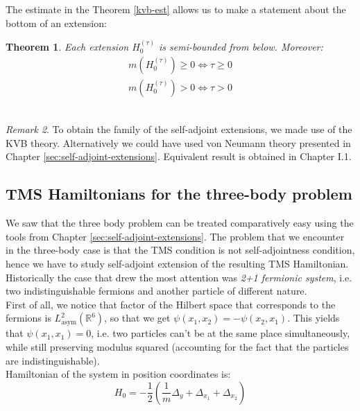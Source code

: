 \documentclass[11pt, a4paper, german]{article}
\theoremstyle{plain}
\newtheorem{theorem}{Theorem}
\theoremstyle{definition}
\theoremstyle{remark}
\newtheorem{remark}[theorem]{Remark}
\numberwithin{equation}{section}
\numberwithin{theorem}{section}
\begin{document}
The estimate in the Theorem \ref{kvb-est} allows us to make a statement about the bottom of an extension:

\begin{theorem}
Each extension $H^{(\tau)}_0$ is semi-bounded from below. Moreover:
\begin{align}
m(H^{(\tau)}_0) \geq 0 \Leftrightarrow \tau \geq 0 \\
m(H^{(\tau)}_0) > 0 \Leftrightarrow \tau > 0
\end{align}\\
\end{theorem}

\begin{remark}
To obtain the family of the self-adjoint extensions, we made use of the KVB theory. Alternatively we could have used von Neumann theory presented in Chapter \ref{sec:self-adjoint-extensions}. Equivalent result is obtained in \cite{solvable-models} Chapter I.1.
\end{remark}

\subsection{TMS Hamiltonians for the three-body problem}

We saw that the three body problem can be treated comparatively easy using the tools from Chapter \ref{sec:self-adjoint-extensions}. The problem that we encounter in the three-body case is that the TMS condition is not self-adjointness condition, hence we have to study self-adjoint extension of the resulting TMS Hamiltonian.\\

Historically the case that drew the most attention was \textit{2+1 fermionic system}, i.e. two indistinguishable fermions and another particle of different nature.\\

First of all, we notice that factor of the Hilbert space that corresponds to the fermions is $ L ^{2} _{\text{asym} } \left( \mathbb{R}^{6} \right) $, so that we get $ \psi \left( x _{1} , x _{2} \right) = - \psi \left( x _{2} , x _{1} \right) $. This yields that $ \psi \left( x_1, x_1 \right) =0 $, i.e. two particles can't be at the same place simultaneously, while still preserving modulus squared (accounting for the fact that the particles are indistinguishable).\\

Hamiltonian of the system in position coordinates is:
\begin{equation}
H _{0} = - \frac{1}{2} \left( \frac{1}{m} \Delta _{y} + \Delta _{x _{1} } + \Delta _{x _{2} } \right)
\end{equation}
\end{document}
